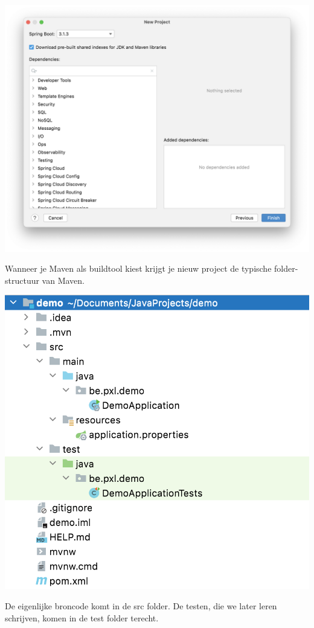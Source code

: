 \includegraphics[width=\textwidth]{./images/chapter1/new_project.png}

Wanneer je Maven als buildtool kiest krijgt je nieuw project de typische folder-structuur van Maven. 

\includegraphics[width=\textwidth]{./images/chapter1/new_project_files.png}

De eigenlijke broncode komt in de src folder. De testen, die we later leren schrijven, komen in de test folder terecht.

